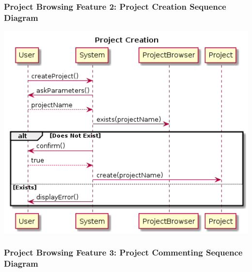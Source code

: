 \documentclass[twoside,letterpaper]{article}
\begin{document}
	\newpage
	
	
	\subsubsection[Project Browsing Feature 2: Project Creation Sequence Diagram]{\rmfamily\bfseries\color{black}
		Project Browsing Feature 2: Project Creation Sequence Diagram}
	\hypertarget{RefHeading22059017292}{}
	
	\bigskip
	
	\includegraphics[width=6.0in]{images/SequenceDiagrams/ProjectBrowsingProjectCreation}
	
	\newpage
	
	
	\subsubsection[Project Browsing Feature 3: Project Commenting Sequence Diagram]{\rmfamily\bfseries\color{black}
		Project Browsing Feature 3: Project Commenting Sequence Diagram}
	\hypertarget{RefHeading22059017292}{}
	
	\bigskip
	
\end{document}
